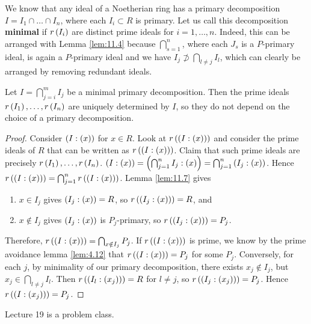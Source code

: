 We know that any ideal of a Noetherian ring has a primary decomposition $ I = I_1 \cap \dots \cap I_n $, where each $ I_i \subset R $ is primary. Let us call this decomposition \textbf{minimal} if $ r\left( I_i \right) $ are distinct prime ideals for $ i = 1, \dots, n $. Indeed, this can be arranged with Lemma \ref{lem:11.4} because $ \bigcap_{s = 1}^n $, where each $ J_s $ is a $ P $-primary ideal, is again a $ P $-primary ideal and we have $ I_j \not\supset \bigcap_{l \ne j} I_l $, which can clearly be arranged by removing redundant ideals.

\begin{theorem}
Let $ I = \bigcap_{j = i}^m I_j $ be a minimal primary decomposition. Then the prime ideals $ r\left( I_1 \right), \dots, r\left( I_n \right) $ are uniquely determined by $ I $, so they do not depend on the choice of a primary decomposition.
\end{theorem}

\begin{proof}
Consider $ \left( I : \left( x \right) \right) $ for $ x \in R $. Look at $ r\left( \left( I : \left( x \right) \right) \right) $ and consider the prime ideals of $ R $ that can be written as $ r\left( \left( I : \left( x \right) \right) \right) $. Claim that such prime ideals are precisely $ r\left( I_1 \right), \dots, r\left( I_n \right) $. $ \left( I : \left( x \right) \right) = \left( \bigcap_{j = 1}^n I_j : \left( x \right) \right) = \bigcap_{j = 1}^n \left( I_j : \left( x \right) \right) $. Hence $ r\left( \left( I : \left( x \right) \right) \right) = \bigcap_{j = 1}^n r\left( \left( I : \left( x \right) \right) \right) $. Lemma \ref{lem:11.7} gives
\begin{enumerate}
\item $ x \in I_j $ gives $ \left( I_j : \left( x \right) \right) = R $, so $ r\left( \left( I_j : \left( x \right) \right) \right) = R $, and
\item $ x \notin I_j $ gives $ \left( I_j : \left( x \right) \right) $ is $ P_j $-primary, so $ r\left( \left( I_j : \left( x \right) \right) \right) = P_j $.
\end{enumerate}
Therefore, $ r\left( \left( I : \left( x \right) \right) \right) = \bigcap_{x \notin I_j} P_j $. If $ r\left( \left( I : \left( x \right) \right) \right) $ is prime, we know by the prime avoidance lemma \ref{lem:4.12} that $ r\left( \left( I : \left( x \right) \right) \right) = P_j $ for some $ P_j $. Conversely, for each $ j $, by minimality of our primary decomposition, there exists $ x_j \notin I_j $, but $ x_j \in \bigcap_{l \ne j} I_l $. Then $ r\left( \left( I_l : \left( x_j \right) \right) \right) = R $ for $ l \ne j $, so $ r\left( \left( I_j : \left( x_j \right) \right) \right) = P_j $. Hence $ r\left( \left( I : \left( x_j \right) \right) \right) = P_j $.
\end{proof}


Lecture 19 is a problem class.


